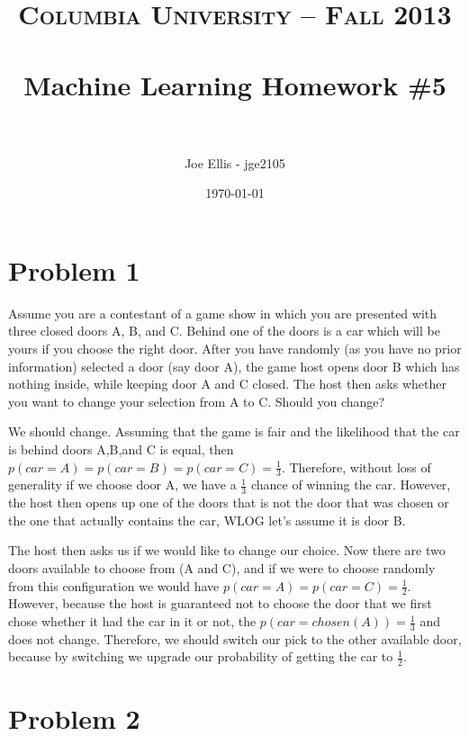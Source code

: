 \documentclass[paper=a4, fontsize=11pt]{scrartcl} %
\title{	
\normalfont \normalsize 
\textsc{Columbia University -- Fall 2013} \\ [25pt] %
\horrule{0.5pt} \\[0.4cm] %
\huge Machine Learning Homework \#5\\ %
\horrule{2pt} \\[0.5cm] %
}
\author{Joe Ellis - jge2105} %
\date{\normalsize\today} %
\begin{document}
\maketitle %


\section{Problem 1}
Assume you are a contestant of a game show in which you are presented with three closed doors A, B, and C. 
Behind one of the doors is a car which will be yours if you choose the right door. 
After you have randomly (as you have no prior information) selected a door (say door A), the game host opens door B which has nothing inside, while keeping door A and C closed. 
The host then asks whether you want to change your selection from A to C. Should you change?

We should change.
Assuming that the game is fair and the likelihood that the car is behind doors A,B,and C is equal, then $p(car = A) = p(car = B) = p(car = C) = \frac{1}{3}$.
Therefore, without loss of generality if we choose door A, we have a $\frac{1}{3}$ chance of winning the car.
However, the host then opens up one of the doors that is not the door that was chosen or the one that actually contains the car, WLOG let's assume it is door B.

The host then asks us if we would like to change our choice.  
Now there are two doors available to choose from (A and C), and if we were to choose randomly from this configuration we would have $p(car = A) = p(car = C) = \frac{1}{2}$.
However, because the host is guaranteed not to choose the door that we first chose whether it had the car in it or not, the $p(car = chosen (A)) = \frac{1}{3}$ and does not change.
Therefore, we should switch our pick to the other available door, because by switching we upgrade our probability of getting the car to $\frac{1}{2}$.


\section{Problem 2}
\end{document}
